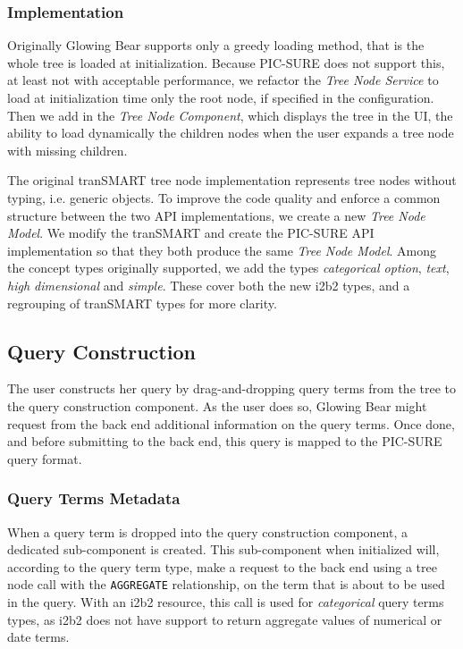 \subsubsection{Implementation}

Originally Glowing Bear supports only a greedy loading method, that is the whole tree is loaded at initialization.
Because PIC-SURE does not support this, at least not with acceptable performance, we refactor the \emph{Tree Node Service} to load at initialization time only the root node, if specified in the configuration.
Then we add in the \emph{Tree Node Component}, which displays the tree in the UI, the ability to load dynamically the children nodes when the user expands a tree node with missing children.

The original tranSMART tree node implementation represents tree nodes without typing, i.e. generic objects.
To improve the code quality and enforce a common structure between the two API implementations, we create a new \emph{Tree Node Model}.
We modify the tranSMART and create the PIC-SURE API implementation so that they both produce the same \emph{Tree Node Model}.
Among the concept types originally supported, we add the types \emph{categorical option}, \emph{text}, \emph{high dimensional} and \emph{simple}.
These cover both the new i2b2 types, and a regrouping of tranSMART types for more clarity.


\subsection{Query Construction}

The user constructs her query by drag-and-dropping query terms from the tree to the query construction component.
As the user does so, Glowing Bear might request from the back end additional information on the query terms.
Once done, and before submitting to the back end, this query is mapped to the PIC-SURE query format.

\subsubsection{Query Terms Metadata}

When a query term is dropped into the query construction component, a dedicated sub-component is created.
This sub-component when initialized will, according to the query term type, make a request to the back end using a tree node call with the \verb|AGGREGATE| relationship, on the term that is about to be used in the query.
With an i2b2 resource, this call is used for \emph{categorical} query terms types, as i2b2 does not have support to return aggregate values of numerical or date terms.

